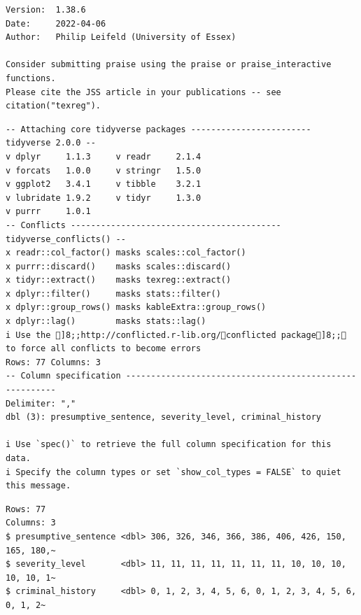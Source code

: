 \documentclass[
  letterpaper,
  DIV=11,
  numbers=noendperiod]{scrartcl}
\begin{document}
\begin{verbatim}
Version:  1.38.6
Date:     2022-04-06
Author:   Philip Leifeld (University of Essex)

Consider submitting praise using the praise or praise_interactive functions.
Please cite the JSS article in your publications -- see citation("texreg").
\end{verbatim}

\begin{verbatim}
-- Attaching core tidyverse packages ------------------------ tidyverse 2.0.0 --
v dplyr     1.1.3     v readr     2.1.4
v forcats   1.0.0     v stringr   1.5.0
v ggplot2   3.4.1     v tibble    3.2.1
v lubridate 1.9.2     v tidyr     1.3.0
v purrr     1.0.1     
-- Conflicts ------------------------------------------ tidyverse_conflicts() --
x readr::col_factor() masks scales::col_factor()
x purrr::discard()    masks scales::discard()
x tidyr::extract()    masks texreg::extract()
x dplyr::filter()     masks stats::filter()
x dplyr::group_rows() masks kableExtra::group_rows()
x dplyr::lag()        masks stats::lag()
i Use the ]8;;http://conflicted.r-lib.org/conflicted package]8;; to force all conflicts to become errors
Rows: 77 Columns: 3
-- Column specification --------------------------------------------------------
Delimiter: ","
dbl (3): presumptive_sentence, severity_level, criminal_history

i Use `spec()` to retrieve the full column specification for this data.
i Specify the column types or set `show_col_types = FALSE` to quiet this message.
\end{verbatim}

\begin{verbatim}
Rows: 77
Columns: 3
$ presumptive_sentence <dbl> 306, 326, 346, 366, 386, 406, 426, 150, 165, 180,~
$ severity_level       <dbl> 11, 11, 11, 11, 11, 11, 11, 10, 10, 10, 10, 10, 1~
$ criminal_history     <dbl> 0, 1, 2, 3, 4, 5, 6, 0, 1, 2, 3, 4, 5, 6, 0, 1, 2~
\end{verbatim}
\end{document}
